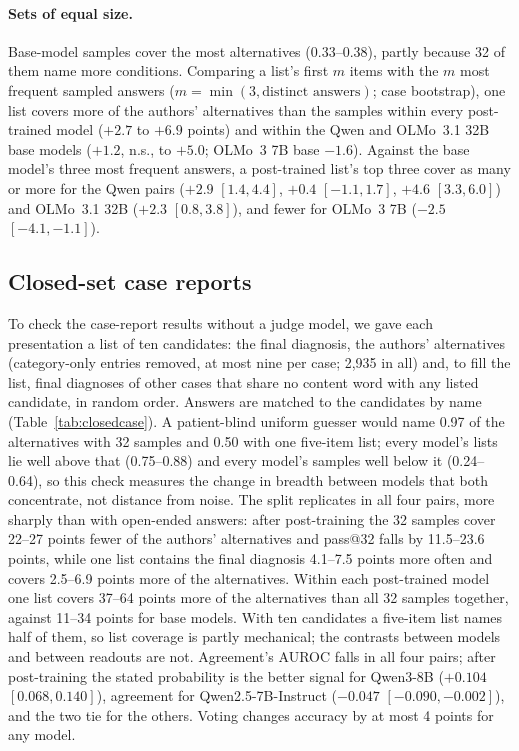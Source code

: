 \documentclass[11pt]{article}
\begin{document}
\paragraph{Sets of equal size.} Base-model samples cover the most alternatives (0.33--0.38), partly because 32 of them name more conditions. Comparing a list's first $m$ items with the $m$ most frequent sampled answers ($m=\min(3,\text{distinct answers})$; case bootstrap), one list covers more of the authors' alternatives than the samples within every post-trained model ($+2.7$ to $+6.9$ points) and within the Qwen and OLMo~3.1 32B base models ($+1.2$, n.s., to $+5.0$; OLMo~3 7B base $-1.6$). Against the base model's three most frequent answers, a post-trained list's top three cover as many or more for the Qwen pairs ($+2.9$ $[1.4,4.4]$, $+0.4$ $[-1.1,1.7]$, $+4.6$ $[3.3,6.0]$) and OLMo~3.1 32B ($+2.3$ $[0.8,3.8]$), and fewer for OLMo~3 7B ($-2.5$ $[-4.1,-1.1]$).

\subsection{Closed-set case reports}\label{sec:closedcase}
To check the case-report results without a judge model, we gave each presentation a list of ten candidates: the final diagnosis, the authors' alternatives (category-only entries removed, at most nine per case; 2,935 in all) and, to fill the list, final diagnoses of other cases that share no content word with any listed candidate, in random order. Answers are matched to the candidates by name (Table~\ref{tab:closedcase}). A patient-blind uniform guesser would name 0.97 of the alternatives with 32 samples and 0.50 with one five-item list; every model's lists lie well above that (0.75--0.88) and every model's samples well below it (0.24--0.64), so this check measures the change in breadth between models that both concentrate, not distance from noise. The split replicates in all four pairs, more sharply than with open-ended answers: after post-training the 32 samples cover 22--27 points fewer of the authors' alternatives and pass@32 falls by 11.5--23.6 points, while one list contains the final diagnosis 4.1--7.5 points more often and covers 2.5--6.9 points more of the alternatives. Within each post-trained model one list covers 37--64 points more of the alternatives than all 32 samples together, against 11--34 points for base models. With ten candidates a five-item list names half of them, so list coverage is partly mechanical; the contrasts between models and between readouts are not. Agreement's AUROC falls in all four pairs; after post-training the stated probability is the better signal for Qwen3-8B ($+0.104$ $[0.068,0.140]$), agreement for Qwen2.5-7B-Instruct ($-0.047$ $[-0.090,-0.002]$), and the two tie for the others. Voting changes accuracy by at most 4 points for any model.
\end{document}
